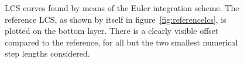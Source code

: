 \begin{figure}[htpb]
    \centering
    
    \caption[LCS curves found by means of the Euler integration scheme]{
        LCS curves found by means of the Euler integration scheme. The
        reference LCS, as shown by itself in figure~\ref{fig:referencelcs},
        is plotted on the bottom layer. There is a clearly visible offset
        compared to the reference, for all but the two smallest numerical step
        lengths considered.}
    \label{fig:lcs_euler}
\end{figure}
